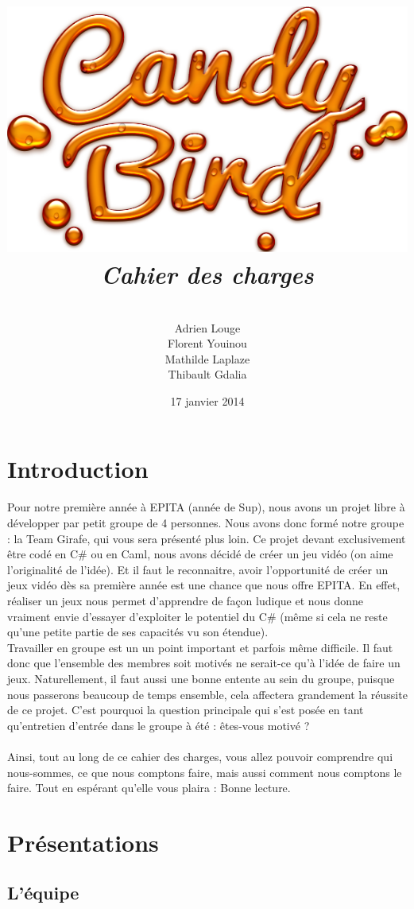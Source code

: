 \documentclass [11pt]{report}
\title{
	\includegraphics[scale=0.43]{images/Logojeu.png}
	 \\\vspace{20mm}
	\textbf{\Huge \itshape Cahier des charges }
	}
\author{ \\\vspace{2mm}
	Adrien Louge \\\vspace{2mm}
	Florent Youinou\\\vspace{2mm}
	Mathilde Laplaze\\\vspace{2mm}
	Thibault Gdalia\\\vspace{30mm}
	}
\date{17 janvier 2014}
\begin{document}
\renewcommand{\baselinestretch}{0.001}
\maketitle
\tableofcontents

\newpage
\chapter {Introduction}
		Pour notre première année à EPITA (année de Sup), nous avons un projet libre à développer par petit groupe de 4 personnes. Nous avons donc formé notre groupe : la Team Girafe, qui vous sera présenté plus loin. Ce projet devant exclusivement être codé en C\# ou en Caml, nous avons décidé de créer un jeu vidéo (on aime l'originalité de l'idée). Et il faut le reconnaitre, avoir l'opportunité de créer un jeux vidéo dès sa première année est une chance que nous offre EPITA. En effet, réaliser un jeux nous permet d'apprendre de façon ludique et nous donne vraiment envie d'essayer d'exploiter le potentiel du C\# (même si cela ne reste qu'une petite partie de ses capacités vu son étendue).\\
\indent Travailler en groupe est un un point important et parfois même difficile. Il faut donc que l'ensemble des membres soit motivés ne serait-ce qu'à l'idée de faire un jeux. Naturellement, il faut aussi une bonne entente au sein du groupe, puisque nous passerons beaucoup de temps ensemble, cela affectera grandement la réussite de ce projet. C'est pourquoi la question principale qui s'est posée en tant qu'entretien d'entrée dans le groupe à été : êtes-vous motivé ?\\\\
\indent Ainsi, tout au long de ce cahier des charges, vous allez pouvoir comprendre qui nous-sommes, ce que nous comptons faire, mais aussi comment nous comptons le faire. Tout en espérant qu'elle vous plaira : Bonne lecture.
		
\chapter {Pr\'esentations}

	\section{ L'\'equipe }
\end{document}
